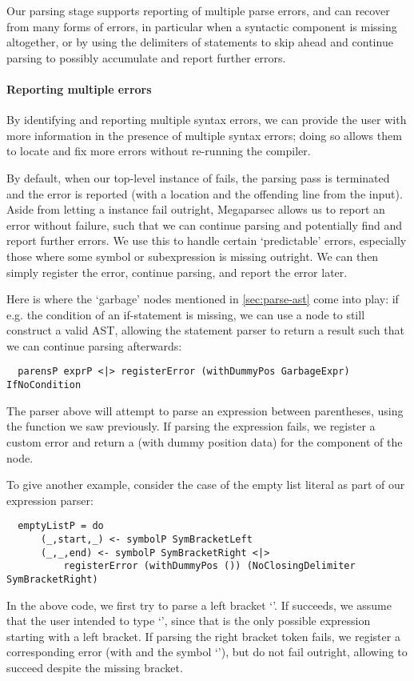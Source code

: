 Our parsing stage supports reporting of multiple parse errors, and can recover
from many forms of errors, in particular when a syntactic component is missing
altogether, or by using the delimiters of statements to skip ahead and continue
parsing to possibly accumulate and report further errors.


\paragraph{Reporting multiple errors}

By identifying and reporting multiple syntax errors, we can provide the user
with more information in the presence of multiple syntax errors; doing so allows
them to locate and fix more errors without re-running the compiler.

By default, when our top-level instance of  fails, the
parsing pass is terminated and the error is reported (with a location and the
offending line from the input).
Aside from letting a  instance fail outright, Megaparsec
allows us to report an error without failure, such that we can continue parsing
and potentially find and report further errors.
We use this to handle certain `predictable' errors, especially those where some
symbol or subexpression is missing outright. We can then simply register the
error, continue parsing, and report the error later.

Here is where the `garbage' nodes mentioned in \cref{sec:parse-ast} come
into play: if e.g. the condition of an if-statement is missing, we can use a
 node to still construct a valid AST, allowing the
statement parser to return a result such that we can continue parsing
afterwards:
\begin{verbatim}
  parensP exprP <|> registerError (withDummyPos GarbageExpr) IfNoCondition
\end{verbatim}
%
The parser above will attempt to parse an expression between parentheses, using
the  function we saw previously.
If parsing the expression fails, we register a custom 
error and return a  (with dummy position data) for the
 component of the  node.


To give another example, consider the case of the empty list literal
\spl{[]} as part of our expression parser:
\begin{verbatim}
  emptyListP = do
      (_,start,_) <- symbolP SymBracketLeft
      (_,_,end) <- symbolP SymBracketRight <|>
          registerError (withDummyPos ()) (NoClosingDelimiter SymBracketRight)
\end{verbatim}
%
In the above code, we first try to parse a left bracket `\code{[}'. If
  succeeds, we assume that the user intended to
type `\code{[]}', since that is the only possible expression starting with a
left bracket.
If parsing the right bracket token fails, we register a corresponding
error (with  and the symbol `\code{]}'),
but do not fail outright, allowing  to succeed despite the
missing bracket.


